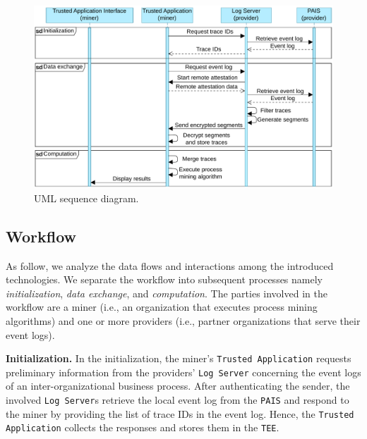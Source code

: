 \begin{figure}[t]
\centering
\includegraphics[width=10.5 cm]{content/figures/sequence_diagram.pdf}
\caption{UML sequence diagram.}
\label{fig:sequence_diagram}
\end{figure}
\subsection{Workflow}
As follow, we analyze the data flows and interactions among the introduced technologies. We separate the workflow into subsequent processes namely \textit{initialization}, \textit{data exchange}, and \textit{computation}.
The parties involved in the workflow are a miner (i.e., an organization that executes process mining algorithms) and one or more providers (i.e., partner organizations that serve their event logs). %

\textbf{Initialization.} In the initialization, the miner's \texttt{Trusted Application} requests preliminary information from the providers' \texttt{Log Server} concerning the event logs of an inter-organizational business process. After authenticating the sender, the involved \texttt{Log Server}s retrieve the local event log from the \texttt{PAIS} and respond to the miner by providing the list of trace IDs in the event log. Hence, the \texttt{Trusted Application} collects the responses and stores them in the \texttt{TEE}.

